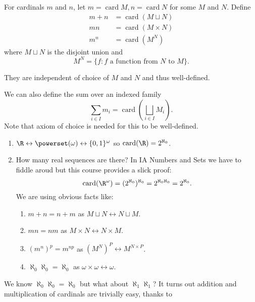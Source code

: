 \documentclass[a4paper]{article}
\DeclareMathOperator{\card}{card}
\newcommand*{\biject}{\leftrightarrow}
\begin{document}
\begin{definition}
  For cardinals \(m\) and \(n\), let \(m = \card M, n = \card N\) for some \(M\) and \(N\). Define
  \begin{align*}
    m + n &= \card(M \sqcup N) \\
    mn &= \card(M \times N) \\
    m^n &= \card(M^N)
  \end{align*}
  where \(M \sqcup N\) is the disjoint union and
  \[
    M^N = \{f: f \text{ a function from } N \text{ to } M\}.
  \]
\end{definition}

\begin{note}
  They are independent of choice of \(M\) and \(N\) and thus well-defined.
\end{note}

We can also define the sum over an indexed family
\[
  \sum_{i \in I} m_i = \card( \bigsqcup_{i \in I} M_i).
\]
Note that axiom of choice is needed for this to be well-defined.

\begin{eg}\leavevmode
  \begin{enumerate}
  \item \(\R \biject \powerset(\omega) \biject \{0, 1\}^\omega\) so \(\card(\R) = 2^{\aleph_0}\).
  \item How many real sequences are there? In IA Numbers and Sets we have to fiddle aroud but this course provides a slick proof:
    \[
      \card(\R^\omega) = (2^{\aleph_0})^{\aleph_0} = 2^{\aleph_0 \aleph_0} = 2^{\aleph_0}.
    \]
    We are using obvious facts like:
    \begin{enumerate}
    \item \(m + n = n + m\) as \(M \sqcup N \biject N \sqcup M\).
    \item \(mn = nm\) as \(M \times N \biject N \times M\).
    \item \((m^n)^p = m^{np}\) as \((M^N)^P \biject M^{N \times P}\).
    \item \(\aleph_0 \aleph_0 = \aleph_0\) as \(\omega \times \omega \biject \omega\).
    \end{enumerate}
  \end{enumerate}
\end{eg}

We know \(\aleph_0 \aleph_0 = \aleph_0\) but what about \(\aleph_1 \aleph_1\)? It turns out addition and multiplication of cardinals are trivially easy, thanks to
\end{document}

